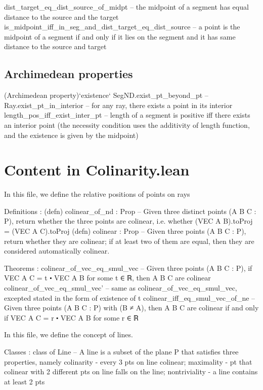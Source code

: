 \documentclass[12pt,a4paper]{article}
\begin{document}
    dist_target_eq_dist_source_of_midpt -- the midpoint of a segment has equal distance to the source and the target
    is_midpoint_iff_in_seg_and_dist_target_eq_dist_source -- a point is the midpoint of a segment if and only if it lies on the segment and it has same distance to the source and target

\subsection{Archimedean properties}
  (Archimedean property)`existence`
    SegND.exist_pt_beyond_pt --
    Ray.exist_pt_in_interior -- for any ray, there exists a point in its interior
    length_pos_iff_exist_inter_pt -- length of a segment is positive iff there exists an interior point (the necessity condition uses the additivity of length function, and the existence is given by the midpoint)

\section{Content in Colinarity.lean}

In this file, we define the relative positions of points on rays

  Definitions :
    (defn) colinear_of_nd : Prop -- Given three distinct points (A B C : P), return whether the three points are colinear, i.e. whether (VEC A B).toProj = (VEC A C).toProj
    (defn) colinear : Prop -- Given three points (A B C : P), return whether they are colinear; if at least two of them are equal, then they are considered automatically colinear.
  
  Theorems :
    colinear_of_vec_eq_smul_vec -- Given three points (A B C : P), if VEC A C = t ⬝ VEC A B for some t ∈ ℝ, then A B C are colinear
    colinear_of_vec_eq_smul_vec' -- same as colinear_of_vec_eq_smul_vec, excepted stated in the form of existence of t
    colinear_iff_eq_smul_vec_of_ne -- Given three points (A B C : P) with (B ≠ A), then A B C are colinear if and only if VEC A C = r ⬝ VEC A B for some r ∈ ℝ
    


In this file, we define the concept of lines.

  Classes : 
    class of Line -- A line is a subset of the plane P that satisfies three properties, namely colinarity - every 3 pts on line colinear; maximality - pt that colinear with 2 different pts on line falls on the line; nontriviality - a line contains at least 2 pts
\end{document}

